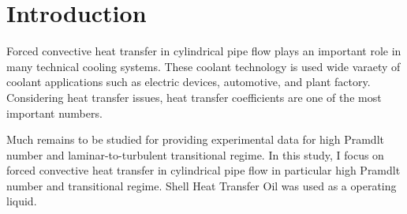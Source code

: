 \documentclass[conference]{IEEEtran}
\begin{document}
%



\section{Introduction}
Forced convective heat transfer in cylindrical pipe flow plays an important role in many technical cooling systems.
These coolant technology is used wide varaety of coolant applications such as electric devices, automotive, and plant factory.
Considering heat transfer issues, heat transfer coefficients are one of the most important numbers.

Much remains to be studied for providing experimental data for high Pramdlt number and laminar-to-turbulent transitional regime.
In this study, I focus on forced convective heat transfer in cylindrical pipe flow in particular high Pramdlt number and transitional regime.
Shell Heat Transfer Oil was used as a operating liquid.
\end{document}
